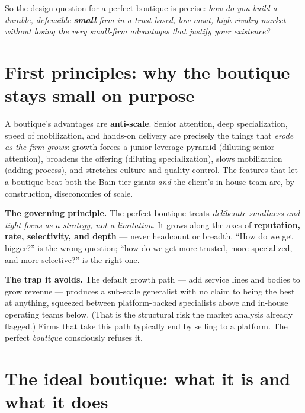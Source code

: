 \documentclass[11pt]{article}
\begin{document}
\noindent So the design question for a perfect boutique is precise: \emph{how do you build a
durable, defensible \textbf{small} firm in a trust-based, low-moat, high-rivalry market ---
without losing the very small-firm advantages that justify your existence?}

\section{First principles: why the boutique stays small on purpose}
A boutique's advantages are \textbf{anti-scale}. Senior attention, deep specialization,
speed of mobilization, and hands-on delivery are precisely the things that \emph{erode as
the firm grows}: growth forces a junior leverage pyramid (diluting senior attention),
broadens the offering (diluting specialization), slows mobilization (adding process), and
stretches culture and quality control. The features that let a boutique beat both the
Bain-tier giants \emph{and} the client's in-house team are, by construction, diseconomies
of scale.

\begin{takeaway}
\textbf{The governing principle.} The perfect boutique treats \emph{deliberate smallness
and tight focus as a strategy, not a limitation}. It grows along the axes of
\textbf{reputation, rate, selectivity, and depth} --- never headcount or breadth. ``How do
we get bigger?'' is the wrong question; ``how do we get more trusted, more specialized, and
more selective?'' is the right one.
\end{takeaway}

\noindent\textbf{The trap it avoids.} The default growth path --- add service lines and
bodies to grow revenue --- produces a sub-scale generalist with no claim to being the best
at anything, squeezed between platform-backed specialists above and in-house operating
teams below. (That is the structural risk the market analysis already flagged.) Firms that
take this path typically end by selling to a platform. The perfect \emph{boutique}
consciously refuses it.

\section{The ideal boutique: what it is and what it does}
\end{document}
